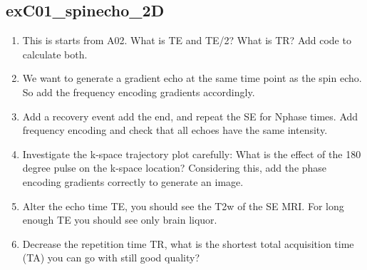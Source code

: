 \documentclass[a4paper,12pt]{extarticle}
\begin{document}
\subsection{exC01\_spinecho\_2D}
\begin{enumerate}
\item This is starts from A02. What is TE and TE/2? What is TR? Add code to calculate both.
\item We want to generate a gradient echo at the same time point as the spin echo. So add the frequency encoding gradients accordingly.

\item Add a recovery event add the end, and repeat the SE for Nphase times. Add frequency encoding and check that all echoes have the same intensity. 

\item Investigate the k-space trajectory plot carefully: What is the effect of the 180 degree pulse on the k-space location? Considering this, add the  phase encoding gradients correctly to generate an image.
\item Alter the echo time TE, you should see the T2w of the SE MRI. For long enough TE you should see only brain liquor.
\item Decrease the repetition time TR, what is the shortest total acquisition time (TA) you can go with still good quality?

\end{enumerate}
\end{document}
